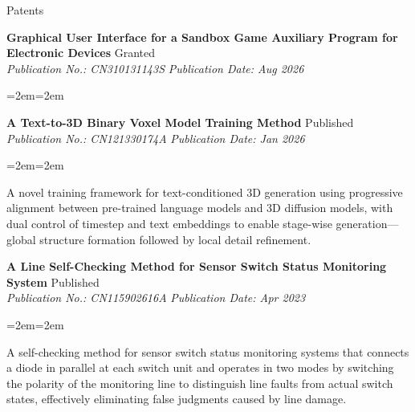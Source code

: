 \documentclass{resume} %
\begin{document}
\vspace{0.6cm}
\begin{rSection}{Patents}

\textbf{Graphical User Interface for a Sandbox Game Auxiliary Program for Electronic Devices} \hfill Granted \\
\textit{Publication No.: CN310131143S} \hfill \textit{Publication Date: Aug 2026} \\
\vspace{-1.5\baselineskip}\begin{list}{}{\leftmargin=2em\rightmargin=2em\topsep=0pt\partopsep=0pt\itemsep=0pt\parsep=0pt}
\item[] 
\end{list}

\textbf{A Text-to-3D Binary Voxel Model Training Method} \hfill Published \\
\textit{Publication No.: CN121330174A} \hfill \textit{Publication Date: Jan 2026} \\
\vspace{-1.5\baselineskip}\begin{list}{}{\leftmargin=2em\rightmargin=2em\topsep=0pt\partopsep=0pt\itemsep=0pt\parsep=0pt}
\item[] A novel training framework for text-conditioned 3D generation using progressive alignment between pre-trained language models and 3D diffusion models, with dual control of timestep and text embeddings to enable stage-wise generation—global structure formation followed by local detail refinement.
\end{list}

\vspace{0.3cm}
\textbf{A Line Self-Checking Method for Sensor Switch Status Monitoring System} \hfill Published \\
\textit{Publication No.: CN115902616A} \hfill \textit{Publication Date: Apr 2023} \\
\vspace{-1.5\baselineskip}\begin{list}{}{\leftmargin=2em\rightmargin=2em\topsep=0pt\partopsep=0pt\itemsep=0pt\parsep=0pt}
\item[] A self-checking method for sensor switch status monitoring systems that connects a diode in parallel at each switch unit and operates in two modes by switching the polarity of the monitoring line to distinguish line faults from actual switch states, effectively eliminating false judgments caused by line damage.
\end{list}


\end{rSection}
\end{document}

